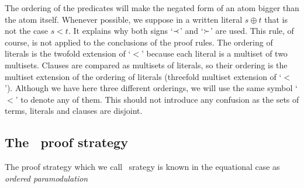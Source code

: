 The ordering of the predicates will make the negated form of an atom bigger
than the atom itself.  Whenever possible, we suppose in a written literal
$s\oplus t$ that is not the case \(s < t\). It explains why both signs
`$\mathbin{\prec}$' and `$\mathbin{\succ}$' are used. This rule, of course, is not applied to the
conclusions of the proof rules.  The ordering of literals is the twofold
extension of `$<$' because each literal is a multiset of two multisets.
Clauses are compared as multisets of literals, so their ordering is the
multiset extension of the ordering of literals (threefold multiset extension
of `$<$'). Although we have here three different orderings, we will use the
same symbol `$<$' to denote any of them. This should not introduce any
confusion as the sets of terms, literals and clauses are disjoint.

\subsection {The \strategy\ proof strategy} \label {se:strategy}
%
The proof strategy
which we call \strategy\ srategy 
is known in the equational case as {\em ordered
paramodulation} 
%
 
